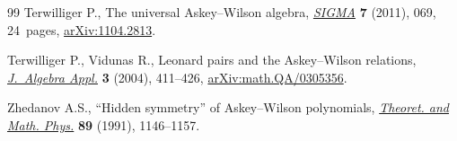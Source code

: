 \documentclass[pdftex]{sigma}
\numberwithin{equation}{section}
\begin{document}
\begin{thebibliography}{99}
Terwilliger P., The universal {A}skey--{W}ilson algebra, \href{https://doi.org/10.3842/SIGMA.2011.069}{\textit{SIGMA}}
 \textbf{7} (2011), 069, 24~pages, \href{https://arxiv.org/abs/1104.2813}{arXiv:1104.2813}.

Terwilliger P., Vidunas R., Leonard pairs and the {A}skey--{W}ilson relations,
 \href{https://doi.org/10.1142/S0219498804000940}{\textit{J.~Algebra Appl.}} \textbf{3} (2004), 411--426, \href{https://arxiv.org/abs/math.QA/0305356}{arXiv:math.QA/0305356}.

Zhedanov A.S., ``{H}idden symmetry'' of {A}skey--{W}ilson polynomials,
 \href{https://doi.org/10.1007/BF01015906}{\textit{Theoret. and Math. Phys.}} \textbf{89} (1991), 1146--1157.

\end{thebibliography}\LastPageEnding
\end{document}
